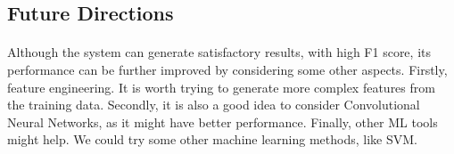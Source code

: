 \documentclass[fleqn,11pt]{olplainarticle}
\begin{document}
\subsection{Future Directions}\label{future}
\paragraph*{}
Although the system can generate satisfactory results, with high F1 score, its performance can be further improved by considering some other aspects. Firstly, feature engineering. It is worth trying to generate more complex features from the training data. Secondly, it is also a good idea to consider Convolutional Neural Networks, as it might have better performance. Finally, other ML tools might help. We could try some other machine learning methods, like SVM.




\end{document}
